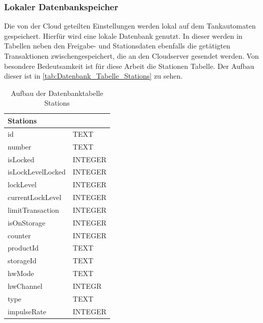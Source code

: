 \subsubsection{Lokaler Datenbankspeicher}
Die von der Cloud geteilten Einstellungen werden lokal auf dem Tankautomaten gespeichert. Hierfür wird eine lokale Datenbank genutzt. In dieser werden in Tabellen neben den Freigabe- und Stationsdaten ebenfalls die getätigten Transaktionen zwischengespeichert, die an den Cloudserver gesendet werden. Von besondere Bedeutsamkeit ist für diese Arbeit die Stationen Tabelle. Der Aufbau dieser ist in \autoref{tab:Datenbank_Tabelle_Stations} zu sehen.
\begin{table}[H]
	\begin{center}
		\begin{tabular}{|ll|}
			\hline
			\multicolumn{2}{|l|}{\textbf{Stations}} \\ \hline
			\multicolumn{1}{|l|}{id} & TEXT \\ \hline
			\multicolumn{1}{|l|}{number} & TEXT \\ \hline
			\multicolumn{1}{|l|}{isLocked} & INTEGER \\ \hline
			\multicolumn{1}{|l|}{isLockLevelLocked} & INTEGER \\ \hline
			\multicolumn{1}{|l|}{lockLevel} & INTEGER \\ \hline
			\multicolumn{1}{|l|}{currentLockLevel} & INTEGER \\ \hline
			\multicolumn{1}{|l|}{limitTransaction} & INTEGER \\ \hline
			\multicolumn{1}{|l|}{isOnStorage} & INTEGER \\ \hline
			\multicolumn{1}{|l|}{counter} & INTEGER \\ \hline
			\multicolumn{1}{|l|}{productId} & TEXT \\ \hline
			\multicolumn{1}{|l|}{storageId} & TEXT \\ \hline
			\multicolumn{1}{|l|}{hwMode} & TEXT \\ \hline
			\multicolumn{1}{|l|}{hwChannel} & INTEGR \\ \hline
			\multicolumn{1}{|l|}{type} & TEXT \\ \hline
			\multicolumn{1}{|l|}{impulseRate} & INTEGER \\ \hline
		\end{tabular}
	\end{center}
	\caption{Aufbau der Datenbanktabelle \glqq{}Stations\grqq{} \cite{Eigene_Darstellung}}
	\label{tab:Datenbank_Tabelle_Stations}
\end{table}

